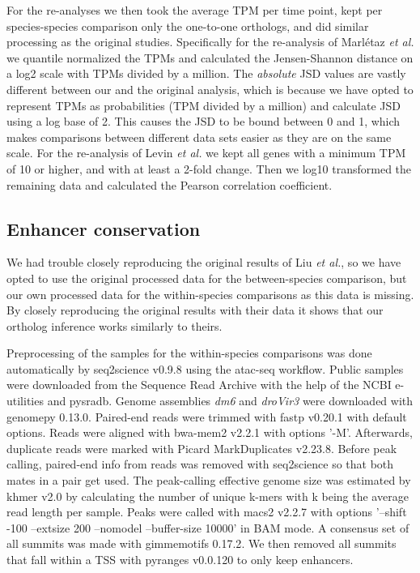 For the re-analyses we then took the average TPM per time point, kept per species-species comparison only the one-to-one orthologs, and did similar processing as the original studies. Specifically for the re-analysis of Marl\'etaz \textit{et al.} we quantile normalized\cite{qnorm} the TPMs and calculated the Jensen-Shannon distance on a log2 scale with TPMs divided by a million. The \textit{absolute} JSD values are vastly different between our and the original analysis, which is because we have opted to represent TPMs as probabilities (TPM divided by a million) and calculate JSD using a log base of 2. This causes the JSD to be bound between 0 and 1, which makes comparisons between different data sets easier as they are on the same scale. For the re-analysis of Levin \textit{et al.} we kept all genes with a minimum TPM of 10 or higher, and with at least a 2-fold change. Then we log10 transformed the remaining data and calculated the Pearson correlation coefficient.

\subsection{Enhancer conservation}

We had trouble closely reproducing the original results of Liu \textit{et al.}, so we have opted to use the original processed data for the between-species comparison, but our own processed data for the within-species comparisons as this data is missing. By closely reproducing the original results with their data it shows that our ortholog inference works similarly to theirs.

Preprocessing of the samples for the within-species comparisons was done automatically by seq2science v0.9.8\cite{seq2science} using the atac-seq workflow. Public samples were downloaded from the Sequence Read Archive with the help of the NCBI e-utilities and pysradb\cite{Choudhary2019}. Genome assemblies \textit{dm6} and \textit{droVir3} were downloaded with genomepy 0.13.0\cite{genomepy}. Paired-end reads were trimmed with fastp v0.20.1\cite{Chen2018} with default options. Reads were aligned with bwa-mem2 v2.2.1\cite{bwamem2} with options '-M'. Afterwards, duplicate reads were marked with Picard MarkDuplicates v2.23.8\cite{picard}. Before peak calling, paired-end info from reads was removed with seq2science so that both mates in a pair get used. The peak-calling effective genome size was estimated by khmer v2.0\cite{Crusoe2015} by calculating the number of unique k-mers with k being the average read length per sample. Peaks were called with macs2 v2.2.7\cite{Zhang2008} with options '--shift -100 --extsize 200 --nomodel --buffer-size 10000' in BAM mode. A consensus set of all summits was made with gimmemotifs 0.17.2\cite{Bruse_2018}. We then removed all summits that fall within a TSS with pyranges v0.0.120\cite{Stovner2019} to only keep enhancers.

